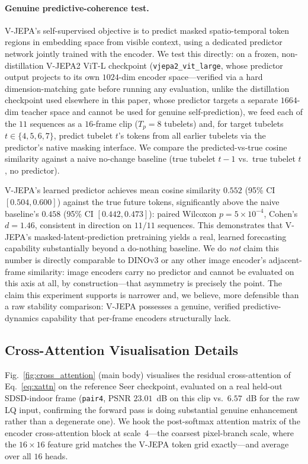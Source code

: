 \paragraph{Genuine predictive-coherence test.} V-JEPA's self-supervised objective is to predict masked spatio-temporal token regions in embedding space from visible context, using a dedicated predictor network jointly trained with the encoder. We test this directly: on a frozen, non-distillation V-JEPA2 ViT-L checkpoint (\texttt{vjepa2\_vit\_large}, whose predictor output projects to its own $1024$-dim encoder space---verified via a hard dimension-matching gate before running any evaluation, unlike the distillation checkpoint used elsewhere in this paper, whose predictor targets a separate $1664$-dim teacher space and cannot be used for genuine self-prediction), we feed each of the $11$ sequences as a $16$-frame clip ($T_p{=}8$ tubelets) and, for target tubelets $t\in\{4,5,6,7\}$, predict tubelet $t$'s tokens from all earlier tubelets via the predictor's native masking interface. We compare the predicted-vs-true cosine similarity against a naive no-change baseline (true tubelet $t{-}1$ vs.\ true tubelet $t$, no predictor).

V-JEPA's learned predictor achieves mean cosine similarity $0.552$ (95\% CI $[0.504, 0.600]$) against the true future tokens, significantly above the naive baseline's $0.458$ (95\% CI $[0.442, 0.473]$): paired Wilcoxon $p{=}5{\times}10^{-4}$, Cohen's $d{=}1.46$, consistent in direction on $11/11$ sequences. This demonstrates that V-JEPA's masked-latent-prediction pretraining yields a real, learned forecasting capability substantially beyond a do-nothing baseline. We do \emph{not} claim this number is directly comparable to DINOv3 or any other image encoder's adjacent-frame similarity: image encoders carry no predictor and cannot be evaluated on this axis at all, by construction---that asymmetry is precisely the point. The claim this experiment supports is narrower and, we believe, more defensible than a raw stability comparison: V-JEPA possesses a genuine, verified predictive-dynamics capability that per-frame encoders structurally lack.


\subsection{Cross-Attention Visualisation Details}\label{app:cross_attention}

Fig.~\ref{fig:cross_attention} (main body) visualises the residual cross-attention of Eq.~\eqref{eq:xattn} on the reference Seer checkpoint, evaluated on a real held-out SDSD-indoor frame (\texttt{pair4}, PSNR $23.01$~dB on this clip vs.\ $6.57$~dB for the raw LQ input, confirming the forward pass is doing substantial genuine enhancement rather than a degenerate one). We hook the post-softmax attention matrix of the encoder cross-attention block at scale~4---the coarsest pixel-branch scale, where the $16{\times}16$ feature grid matches the V-JEPA token grid exactly---and average over all $16$ heads.

